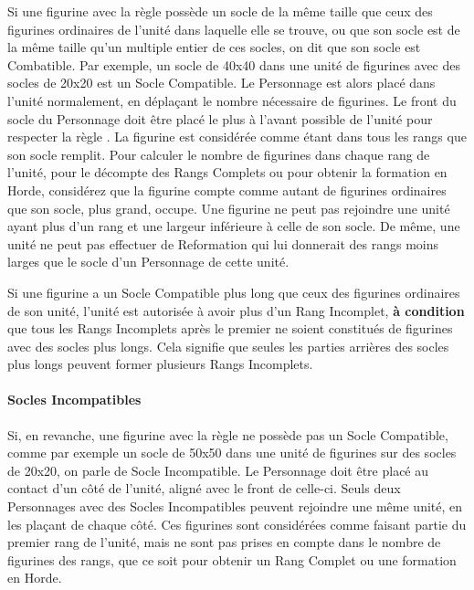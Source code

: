 Si une figurine avec la règle \frontrank{} possède un socle de la même taille que ceux des figurines ordinaires de l'unité dans laquelle elle se trouve, ou que son socle est de la même taille qu'un multiple entier de ces socles, on dit que son socle est Combatible. Par exemple, un socle de \unit{40x40}{\milli\meter} dans une unité de figurines avec des socles de \unit{20x20}{\milli\meter} est un Socle Compatible. Le Personnage est alors placé dans l'unité normalement, en déplaçant le nombre nécessaire de figurines. Le front du socle du Personnage doit être placé le plus à l'avant possible de l'unité pour respecter la règle \frontrank{}. La figurine est considérée comme étant dans tous les rangs que son socle remplit. Pour calculer le nombre de figurines dans chaque rang de l'unité, pour le décompte des Rangs Complets ou pour obtenir la formation en Horde, considérez que la figurine compte comme autant de figurines ordinaires que son socle, plus grand, occupe. Une figurine ne peut pas rejoindre une unité ayant plus d'un rang et une largeur inférieure à celle de son socle. De même, une unité ne peut pas effectuer de Reformation qui lui donnerait des rangs moins larges que le socle d'un Personnage de cette unité.

Si une figurine a un Socle Compatible plus long que ceux des figurines ordinaires de son unité, l'unité est autorisée à avoir plus d'un Rang Incomplet, \textbf{à condition} que tous les Rangs Incomplets après le premier ne soient constitués de figurines avec des socles plus longs. Cela signifie que seules les parties arrières des socles plus longs peuvent former plusieurs Rangs Incomplets.

\paragraph{Socles Incompatibles}

Si, en revanche, une figurine avec la règle \frontrank{} ne possède pas un Socle Compatible, comme par exemple un socle de \unit{50x50}{\milli\meter} dans une unité de figurines sur des socles de \unit{20x20}{\milli\meter}, on parle de Socle Incompatible. Le Personnage doit être placé au contact d'un côté de l'unité, aligné avec le front de celle-ci. Seuls deux Personnages avec des Socles Incompatibles peuvent rejoindre une même unité, en les plaçant de chaque côté. Ces figurines sont considérées comme faisant partie du premier rang de l'unité, mais ne sont pas prises en compte dans le nombre de figurines des rangs, que ce soit pour obtenir un Rang Complet ou une formation en Horde.

